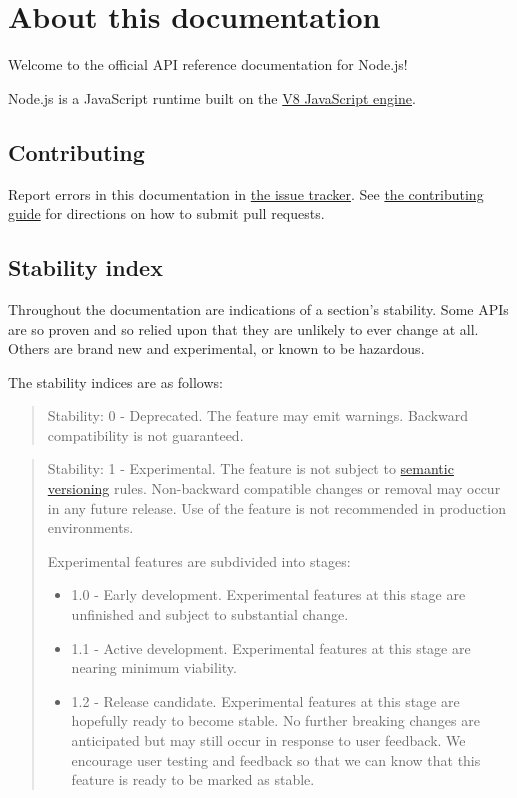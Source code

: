 \section{About this documentation}\label{about-this-documentation}

Welcome to the official API reference documentation for Node.js!

Node.js is a JavaScript runtime built on the \href{https://v8.dev/}{V8
JavaScript engine}.

\subsection{Contributing}\label{contributing}

Report errors in this documentation in
\href{https://github.com/nodejs/node/issues/new}{the issue tracker}. See
\href{https://github.com/nodejs/node/blob/HEAD/CONTRIBUTING.md}{the
contributing guide} for directions on how to submit pull requests.

\subsection{Stability index}\label{stability-index}

Throughout the documentation are indications of a section's stability.
Some APIs are so proven and so relied upon that they are unlikely to
ever change at all. Others are brand new and experimental, or known to
be hazardous.

The stability indices are as follows:

\begin{quote}
Stability: 0 - Deprecated. The feature may emit warnings. Backward
compatibility is not guaranteed.
\end{quote}

\begin{quote}
Stability: 1 - Experimental. The feature is not subject to
\href{https://semver.org/}{semantic versioning} rules. Non-backward
compatible changes or removal may occur in any future release. Use of
the feature is not recommended in production environments.

Experimental features are subdivided into stages:

\begin{itemize}
\tightlist
\item
  1.0 - Early development. Experimental features at this stage are
  unfinished and subject to substantial change.
\item
  1.1 - Active development. Experimental features at this stage are
  nearing minimum viability.
\item
  1.2 - Release candidate. Experimental features at this stage are
  hopefully ready to become stable. No further breaking changes are
  anticipated but may still occur in response to user feedback. We
  encourage user testing and feedback so that we can know that this
  feature is ready to be marked as stable.
\end{itemize}
\end{quote}

